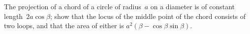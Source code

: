 The projection of a chord of a circle of radius~$a$ on a diameter is of
constant length~$2a\cos\beta$; show that the locus of the middle point of the chord
consists of two loops, and that the area of either is $a^{2}(\beta - \cos\beta\sin\beta)$.

